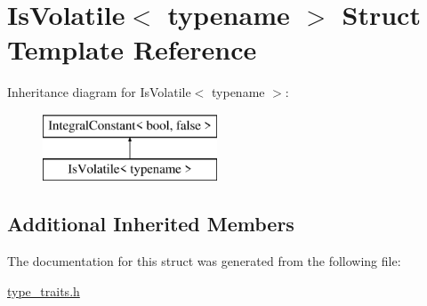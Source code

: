 \hypertarget{struct_is_volatile}{}\section{Is\+Volatile$<$ typename $>$ Struct Template Reference}
\label{struct_is_volatile}
Inheritance diagram for Is\+Volatile$<$ typename $>$\+:\begin{figure}[H]
\begin{center}
\leavevmode
\includegraphics[height=2.000000cm]{struct_is_volatile}
\end{center}
\end{figure}
\subsection*{Additional Inherited Members}


The documentation for this struct was generated from the following file\+:\begin{DoxyCompactItemize}
\item 
\hyperlink{type__traits_8h}{type\+\_\+traits.\+h}\end{DoxyCompactItemize}
